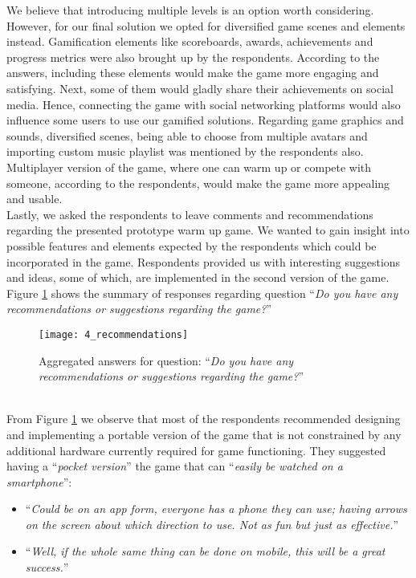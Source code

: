 We believe that introducing multiple levels is an option worth considering. However, for our final solution we opted for diversified game scenes and elements instead. Gamification elements like scoreboards, awards, achievements and progress metrics were also brought up by the respondents. %
According to the answers, including these elements would make the game more engaging and satisfying. Next, some of them would gladly share their achievements on social media. Hence, connecting the game with social networking platforms would also influence some users to use our gamified solutions. Regarding game graphics and sounds, diversified scenes, being able to choose from multiple avatars and importing custom music playlist was mentioned by the respondents also. Multiplayer version of the game, where one can warm up or compete with someone, according to the respondents, would make the game more appealing and usable. \\Lastly, we asked the respondents to leave comments and recommendations regarding the presented prototype warm up game. We wanted to gain insight into possible features and elements expected by the respondents which could be incorporated in the game. Respondents provided us with interesting suggestions and ideas, some of which, are implemented in the second version of the game. Figure \ref{fig:4_recommendations} shows the summary of responses regarding question ``\textit{Do you have any recommendations or suggestions regarding the game?}''\\
\begin{figure}[h]
    \centering
    \texttt{[image: 4\_recommendations]}
    \caption{Aggregated answers for question: ``\textit{Do you have any recommendations or suggestions regarding the game?}''}
    \label{fig:4_recommendations}
\end{figure}\\ 
From Figure \ref{fig:4_recommendations} we observe that most of the respondents recommended designing and implementing a portable version of the game that is not constrained by any additional hardware currently required for game functioning. They suggested having a ``\textit{pocket version}'' the game that can ``\textit{easily be watched on a smartphone}'':
\begin{itemize}
\item ``\textit{Could be on an app form, everyone has a phone they can use; having arrows on the screen about which direction to use. Not as fun but just as effective.}''
\item ``\textit{Well, if the whole same thing can be done on mobile, this will be a great success.}''
\end{itemize}
